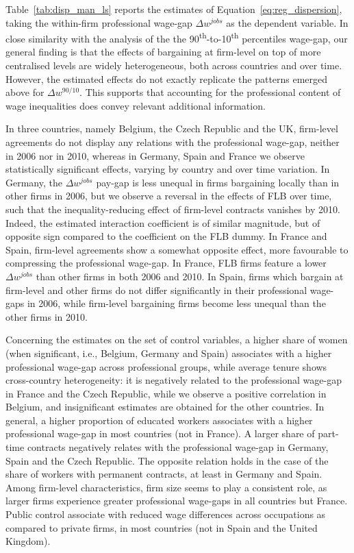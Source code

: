 \documentclass[12pt]{article}
\begin{document}
Table~\ref{tab:disp_man_ls} reports the estimates of
Equation~\ref{eq:reg_dispersion}, taking the within-firm professional
wage-gap $\Delta w^{jobs}$ as the dependent variable. In close
similarity with the analysis of the the
90\textsuperscript{th}-to-10\textsuperscript{th} percentiles wage-gap,
our general finding is that the effects of bargaining at firm-level on
top of more centralised levels are widely heterogeneous, both across
countries and over time.  However, the estimated effects do not
exactly replicate the patterns emerged above for $\Delta w^{90/10}$.
This supports that accounting for the professional content of wage
inequalities does convey relevant additional information.

In three countries, namely Belgium, the Czech Republic and the UK,
firm-level agreements do not display any relations with the
professional wage-gap, neither in 2006 nor in 2010, whereas in
Germany, Spain and France we observe statistically significant
effects, varying by country and over time variation. In Germany, the
$\Delta w^{jobs}$ pay-gap is less unequal in firms bargaining locally
than in other firms in 2006, but we observe a reversal in the effects
of FLB over time, such that the inequality-reducing effect of
firm-level contracts vanishes by 2010. Indeed, the estimated
interaction coefficient is of similar magnitude, but of opposite sign
compared to the coefficient on the FLB dummy. In France and Spain,
firm-level agreements show a somewhat opposite effect, more favourable
to compressing the professional wage-gap. In France, FLB firms feature
a lower $\Delta w^{jobs}$ than other firms in both 2006 and 2010. In
Spain, firms which bargain at firm-level and other firms do not differ
significantly in their professional wage-gaps in 2006, while
firm-level bargaining firms become less unequal than the other firms
in 2010.

Concerning the estimates on the set of control variables, a higher
share of women (when significant, i.e., Belgium, Germany and Spain)
associates with a higher professional wage-gap across professional
groups, while average tenure shows cross-country heterogeneity: it is
negatively related to the professional wage-gap in France and the
Czech Republic, while we observe a positive correlation in Belgium,
and insignificant estimates are obtained for the other countries.  In
general, a higher proportion of educated workers associates with a
higher professional wage-gap in most countries (not in France). A
larger share of part-time contracts negatively relates with the
professional wage-gap in Germany, Spain and the Czech Republic. The
opposite relation holds in the case of the share of workers with
permanent contracts, at least in Germany and Spain. Among firm-level
characteristics, firm size seems to play a consistent role, as larger
firms experience greater professional wage-gaps in all countries but
France. Public control associate with reduced wage differences across
occupations as compared to private firms, in most countries (not in
Spain and the United Kingdom).\\
\end{document}
